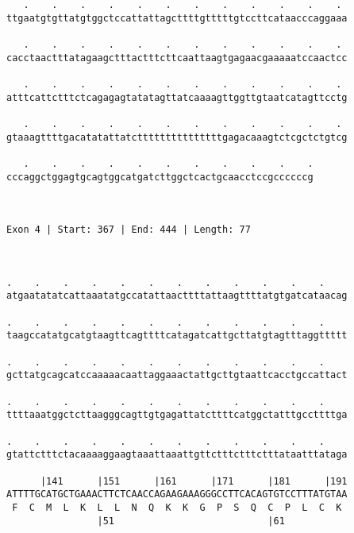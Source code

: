 \documentclass{article}
\begin{document}
\begin{Verbatim}
   .    .    .    .    .    .    .    .    .    .    .    . 
ttgaatgtgttatgtggctccattattagcttttgtttttgtccttcataacccaggaaa
                                                            
   .    .    .    .    .    .    .    .    .    .    .    . 
cacctaactttatagaagctttactttcttcaattaagtgagaacgaaaaatccaactcc
                                                            
   .    .    .    .    .    .    .    .    .    .    .    . 
atttcattctttctcagagagtatatagttatcaaaagttggttgtaatcatagttcctg
                                                            
   .    .    .    .    .    .    .    .    .    .    .    . 
gtaaagttttgacatatattatctttttttttttttttgagacaaagtctcgctctgtcg
                                                            
   .    .    .    .    .    .    .    .    .    .    .
cccaggctggagtgcagtggcatgatcttggctcactgcaacctccgccccccg
                                                      
                                                      
 
Exon 4 | Start: 367 | End: 444 | Length: 77



.    .    .    .    .    .    .    .    .    .    .    .    
atgaatatatcattaaatatgccatattaacttttattaagttttatgtgatcataacag
                                                            
.    .    .    .    .    .    .    .    .    .    .    .    
taagccatatgcatgtaagttcagttttcatagatcattgcttatgtagtttaggttttt
                                                            
.    .    .    .    .    .    .    .    .    .    .    .    
gcttatgcagcatccaaaaacaattaggaaactattgcttgtaattcacctgccattact
                                                            
.    .    .    .    .    .    .    .    .    .    .    .    
ttttaaatggctcttaagggcagttgtgagattatcttttcatggctatttgccttttga
                                                            
.    .    .    .    .    .    .    .    .    .    .    .    
gtattctttctacaaaaggaagtaaattaaattgttctttctttctttataatttataga
                                                            
      |141      |151      |161      |171      |181      |191
ATTTTGCATGCTGAAACTTCTCAACCAGAAGAAAGGGCCTTCACAGTGTCCTTTATGTAA
 F  C  M  L  K  L  L  N  Q  K  K  G  P  S  Q  C  P  L  C  K 
                |51                           |61           
  

\end{Verbatim}
\end{document}
